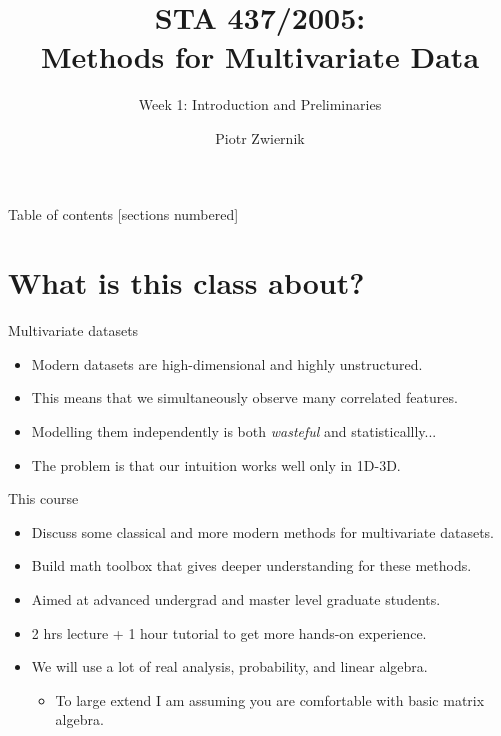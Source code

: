 \documentclass[11pt,handout,aspectratio=169]{beamer}
\title[STA437-Week1]{STA 437/2005: \\ Methods for Multivariate Data}
\subtitle[]{Week 1: Introduction and Preliminaries}
\author[Prob Learning]{Piotr Zwiernik}
\institute[UofT]{University of Toronto}
\date{}
\begin{document}


\maketitle

\begin{frame}{Table of contents}
  [sections numbered]
  \tableofcontents%
\end{frame}



\section{What is this class about?}


\begin{frame}{Multivariate datasets}
\begin{itemize}
	\item Modern datasets are high-dimensional and highly unstructured.\\[.7cm]
	\item This means that we simultaneously observe many correlated features. \\[.7cm]
	\item Modelling them independently is both \emph{wasteful} and statisticallly...\\[.7cm]
	\item The problem is that our intuition works well only in 1D-3D.
\end{itemize}	
\end{frame}

\begin{frame}{This course}
  \begin{itemize}
  \item Discuss some classical and more modern methods for multivariate datasets.\\[.7cm]
  \item Build math toolbox that gives deeper understanding for these methods.\\[.7cm]
  \item Aimed at advanced undergrad and master level graduate students. \\[.7cm]
  \item 2 hrs lecture + 1 hour tutorial to get more hands-on experience. \\[.7cm]
  \item We will use \alert{a lot of} real analysis, probability, and linear algebra. 
  \begin{itemize}
\item To large extend I am assuming you are comfortable with basic matrix algebra. 
  \end{itemize}  
  \end{itemize}
\end{frame}
\end{document}
